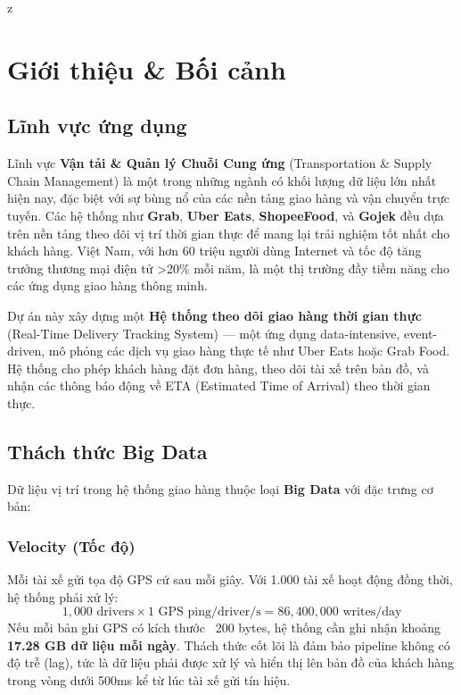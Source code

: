 z%
\section{Giới thiệu \& Bối cảnh}
\label{sec:introduction}

\subsection{Lĩnh vực ứng dụng}
\label{sec:application-domain}

Lĩnh vực \textbf{Vận tải \& Quản lý Chuỗi Cung ứng} (Transportation \& Supply Chain Management) là một trong những ngành có khối lượng dữ liệu lớn nhất hiện nay, đặc biệt với sự bùng nổ của các nền tảng giao hàng và vận chuyển trực tuyến. Các hệ thống như \textbf{Grab}, \textbf{Uber Eats}, \textbf{ShopeeFood}, và \textbf{Gojek} đều dựa trên nền tảng theo dõi vị trí thời gian thực để mang lại trải nghiệm tốt nhất cho khách hàng. Việt Nam, với hơn 60 triệu người dùng Internet và tốc độ tăng trưởng thương mại điện tử >20\% mỗi năm, là một thị trường đầy tiềm năng cho các ứng dụng giao hàng thông minh.

Dự án này xây dựng một \textbf{Hệ thống theo dõi giao hàng thời gian thực} (Real-Time Delivery Tracking System) — một ứng dụng data-intensive, event-driven, mô phỏng các dịch vụ giao hàng thực tế như Uber Eats hoặc Grab Food. Hệ thống cho phép khách hàng đặt đơn hàng, theo dõi tài xế trên bản đồ, và nhận các thông báo động về ETA (Estimated Time of Arrival) theo thời gian thực.

\subsection{Thách thức Big Data}
\label{sec:big-data-challenge}

Dữ liệu vị trí trong hệ thống giao hàng thuộc loại \textbf{Big Data} với đặc trưng cơ bản:

\subsubsection{Velocity (Tốc độ)}
Mỗi tài xế gửi tọa độ GPS cứ sau mỗi giây. Với 1.000 tài xế hoạt động đồng thời, hệ thống phải xử lý:
\[
1{,}000 \text{ drivers} \times 1 \text{ GPS ping/driver/s} = 86{,}400{,}000 \text{ writes/day}
\]
Nếu mỗi bản ghi GPS có kích thước ~200 bytes, hệ thống cần ghi nhận khoảng \textbf{17.28 GB dữ liệu mỗi ngày}. Thách thức cốt lõi là đảm bảo pipeline không có độ trễ (lag), tức là dữ liệu phải được xử lý và hiển thị lên bản đồ của khách hàng trong vòng dưới 500ms kể từ lúc tài xế gửi tín hiệu.

